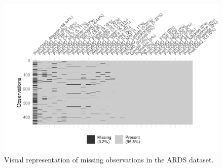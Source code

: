 \documentclass[12pt,]{article}
\begin{document}
\begin{figure}[H]

{\centering \includegraphics[width=1\linewidth]{figure/graphics-missing-data-1} 

}

\caption{\label{fig.ensemble-imputation}Visual representation of missing observations in the ARDS dataset.}\label{fig:missing-data}
\end{figure}
\end{document}
